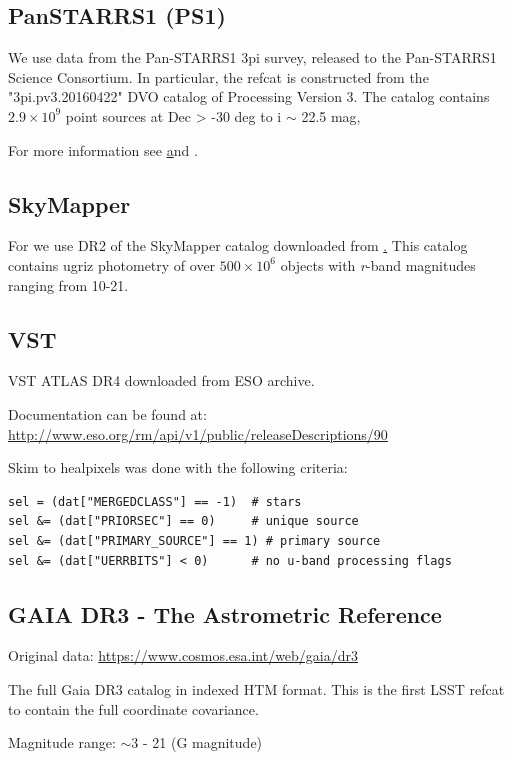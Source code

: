 \subsection{PanSTARRS1 (PS1)}
\label{sec:ps1}

We use data from the Pan-STARRS1 3pi survey, released to the Pan-STARRS1 Science Consortium.
In particular, the refcat is constructed from the "3pi.pv3.20160422" DVO catalog of Processing Version 3.
The catalog contains $2.9 \times 10^9$ point sources at Dec > -30 deg to i $\sim$ 22.5 mag,

For more information see \href{http://panstarrs.stsci.edu} and \citet{Chambers:2016}.

\subsection{SkyMapper}
\label{sec:skymapper}
For \monster we use DR2 of the SkyMapper catalog \citep{Onken:2019} downloaded from \href{https://skymapper.anu.edu.au/_data/DR2/}. 
This catalog contains ugriz photometry of over $500 \times 10^6$ objects with \textit{r}-band magnitudes ranging from 10-21. 

\subsection{VST}
\label{sec:vst}

VST ATLAS DR4 downloaded from ESO archive.

Documentation can be found at: \url{http://www.eso.org/rm/api/v1/public/releaseDescriptions/90}

Skim to healpixels was done with the following criteria:
\begin{verbatim}
sel = (dat["MERGEDCLASS"] == -1)  # stars
sel &= (dat["PRIORSEC"] == 0)     # unique source 
sel &= (dat["PRIMARY_SOURCE"] == 1) # primary source 
sel &= (dat["UERRBITS"] < 0)      # no u-band processing flags
\end{verbatim}

\subsection{GAIA DR3 - The Astrometric Reference}
\label{sec:gaiadr3}
Original data: \url{https://www.cosmos.esa.int/web/gaia/dr3}

The full Gaia DR3 catalog in indexed HTM format. 
This is the first LSST refcat to contain the full coordinate covariance.

Magnitude range: $\sim$3 - 21 (G magnitude)

